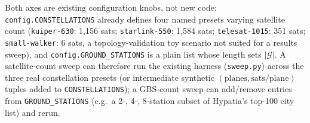 Both axes are existing configuration knobs, not new code:
\texttt{config.CONSTELLATIONS} already defines four named presets varying
satellite count (\texttt{kuiper-630}: 1{,}156 sats; \texttt{starlink-550}:
1{,}584 sats; \texttt{telesat-1015}: 351 sats; \texttt{small-walker}: 6
sats, a topology-validation toy scenario not suited for a results sweep),
and \texttt{config.GROUND\_STATIONS} is a plain list whose length sets
$|\mathcal{G}|$. A satellite-count sweep can therefore run the existing
harness (\texttt{sweep.py}) across the three real constellation presets (or
intermediate synthetic $(\text{planes}, \text{sats/plane})$ tuples added to
\texttt{CONSTELLATIONS}); a GBS-count sweep can add/remove entries from
\texttt{GROUND\_STATIONS} (e.g.\ a 2-, 4-, 8-station subset of Hypatia's
top-100 city list) and rerun. 
